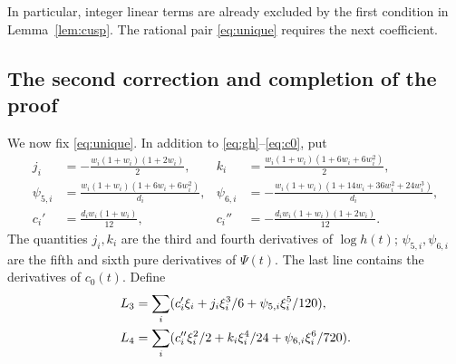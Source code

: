 \documentclass[11pt,reqno]{amsart}
\theoremstyle{remark}
\numberwithin{equation}{section}
\begin{document}
In particular, integer linear terms are already excluded by the first
condition in Lemma~\ref{lem:cusp}. The rational pair
\eqref{eq:unique} requires the next coefficient.

\subsection{The second correction and completion of the proof}
We now fix \eqref{eq:unique}. In addition to
\eqref{eq:gh}--\eqref{eq:c0}, put
\begin{align}
 j_i&=-\frac{w_i(1+w_i)(1+2w_i)}2,&
 k_i&=\frac{w_i(1+w_i)(1+6w_i+6w_i^2)}2,\label{eq:jk}\\
 \psi_{5,i}&=\frac{w_i(1+w_i)(1+6w_i+6w_i^2)}{d_i},&
 \psi_{6,i}&=-\frac{w_i(1+w_i)(1+14w_i+36w_i^2+24w_i^3)}{d_i},
 \label{eq:WZ}\\
 c_i'&=\frac{d_iw_i(1+w_i)}{12},&
 c_i''&=-\frac{d_iw_i(1+w_i)(1+2w_i)}{12}.
 \label{eq:cderivatives}
\end{align}
The quantities $j_i,k_i$ are the third and fourth derivatives of
$\log h(t)$; $\psi_{5,i},\psi_{6,i}$ are the fifth and sixth pure derivatives of
$\Psi(t)$. The last line contains the derivatives of $c_0(t)$.
Define
\begin{align}
 L_3&=\sum_i(c_i'\xi_i+j_i\xi_i^3/6+\psi_{5,i}\xi_i^5/120),\notag\\
 L_4&=\sum_i(c_i''\xi_i^2/2+k_i\xi_i^4/24+\psi_{6,i}\xi_i^6/720).
 \label{eq:L34}
\end{align}
\end{document}
